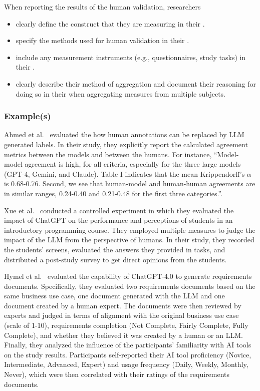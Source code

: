 When reporting the results of the human validation, researchers
\begin{itemize}
    \item \must clearly define the construct that they are measuring in their \paper.
    \item \must specify the methods used for human validation in their \paper.
    \item \should include any measurement instruments (e.g., questionnaires, study tasks) in their \supplementarymaterial.
    \item \should clearly describe their method of aggregation and document their reasoning for doing so in their \paper when aggregating measures from multiple subjects.
\end{itemize}

\subsubsection{Example(s)}

Ahmed et al.~\cite{DBLP:journals/corr/abs-2408-05534} evaluated the how human annotations can be replaced by LLM generated labels.
In their study, they explicitly report the calculated agreement metrics between the models and between the humans.
For instance, ``Model-model agreement is high, for all criteria, especially for the three large models (GPT-4, Gemini, and Claude). Table I indicates that the mean Krippendorff’s $\alpha$ is 0.68-0.76. 
Second, we see that human-model and human-human agreements are in similar ranges, 0.24-0.40 and 0.21-0.48
for the first three categories.''.

Xue et al.~\cite{DBLP:conf/icse/XueCBTH24} conducted a controlled experiment in which they evaluated the impact of ChatGPT on the performance and perceptions of students in an introductory programming course.
They employed multiple measures to judge the impact of the LLM from the perspective of humans.
In their study, they recorded the students' screens, evaluated the answers they provided in tasks, and distributed a post-study survey to get direct opinions from the students.

Hymel et al.~\cite{hymel2025analysisllmsvshuman} evaluated the capability of ChatGPT-4.0 to generate requirements documents. 
Specifically, they evaluated two requirements documents based on the same business use case, one document generated with the LLM and one document created by a human expert.
The documents were then reviewed by experts and judged in terms of alignment with the original business use case (scale of 1-10), requirements completion (Not Complete, Fairly Complete, Fully Complete), and whether they believed it was created by a human or an LLM.
Finally, they analyzed the influence of the participants' familiarity with AI tools on the study results.
Participants self-reported their AI tool proficiency (Novice, Intermediate, Advanced, Expert) and usage frequency (Daily, Weekly, Monthly, Never), which were then correlated with their ratings of the requirements documents.



